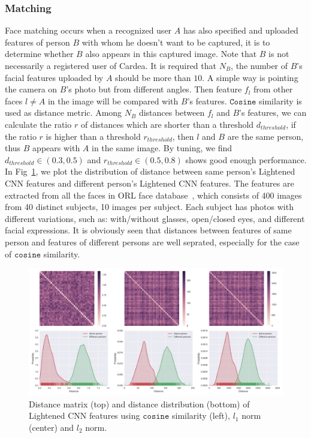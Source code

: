 \subsubsection{Matching}
Face matching occurs when a recognized user $A$ has also specified and uploaded features of person $B$ with whom he doesn't want to be captured, it is to determine whether $B$ also appears in this captured image. Note that $B$ is not necessarily a registered user of Cardea. It is required that $N_B$, the number of $B$'s facial features uploaded by $A$ should be more than $10$. A simple way is pointing the camera on $B$'s photo but from different angles. Then feature $f_l$ from other faces $l\neq A$ in the image will be compared with $B$'s features. $\mathtt{Cosine}$ similarity is used as distance metric. Among $N_B$ distances between $f_l$ and $B$'s features, we can calculate the ratio $r$ of distances which are shorter than a threshold $d_ \mathit{threshold}$, if the ratio $r$ is higher than a threshold $r_ \mathit{threshold}$, then $l$ and $B$ are the same person, thus $B$ appears with $A$ in the same image. By tuning, we find $d_ \mathit{threshold} \in (0.3, 0.5)$ and $r_ \mathit{threshold} \in (0.5, 0.8) $ shows good enough performance. In Fig~\ref{fig:ch4-mfmsim}, we plot the distribution of distance between same person's Lightened CNN features and different person's Lightened CNN features. The features are extracted from all the faces in ORL face database~\cite{links:orlfacedb}, which consists of 400 images from 40 distinct subjects, 10 images per subject. Each subject has photos with different variations, such as: with/without glasses, open/closed eyes, and different facial expressions. It is obviously seen that distances between features of same person and features of different persons are well seprated, especially for the case of $\mathtt{cosine}$ similarity.

\begin{figure}[!htbp]
    \centering
    \includegraphics[width=1.0\textwidth]{figure/ch4-mfmsim.png}
    \caption{Distance matrix (top) and distance distribution (bottom) of Lightened CNN features using $\mathtt{cosine}$ similarity (left), $l_1$ norm (center) and $l_2$ norm.}
    \label{fig:ch4-mfmsim}
\end{figure}


